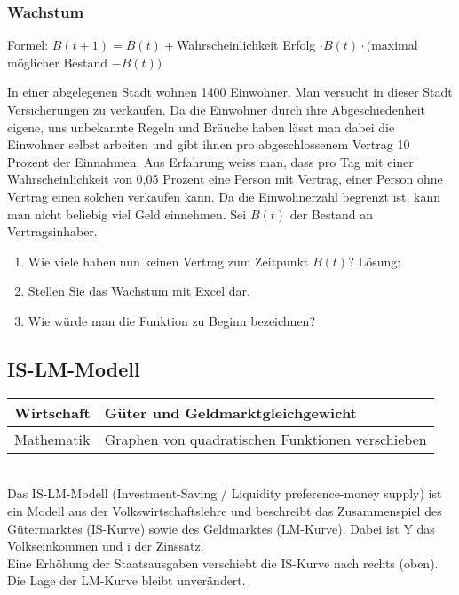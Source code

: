 \documentclass[11pt, twocolumn, a4paper]{scrartcl}
\begin{document}
\subsubsection{Wachstum}
Formel:
$B(t+1) = B(t) +$Wahrscheinlichkeit Erfolg $\cdot B(t) \cdot ($maximal möglicher Bestand $- B(t))$

In einer abgelegenen Stadt wohnen 1400 Einwohner. Man versucht in dieser Stadt Versicherungen zu verkaufen. Da die Einwohner durch ihre Abgeschiedenheit eigene, uns unbekannte Regeln und Bräuche haben lässt man dabei die Einwohner selbst arbeiten und gibt ihnen pro abgeschlossenem Vertrag 10 Prozent der Einnahmen. Aus Erfahrung weiss man, dass pro Tag mit einer Wahrscheinlichkeit von 0,05 Prozent eine Person mit Vertrag, einer Person ohne Vertrag einen solchen verkaufen kann. Da die Einwohnerzahl begrenzt ist, kann man nicht beliebig viel Geld einnehmen.
Sei $B(t)$ der Bestand an Vertragsinhaber. 
\begin{enumerate}
\item Wie viele haben nun keinen Vertrag zum Zeitpunkt $B(t)$? Lösung: \\

\item Stellen Sie das Wachstum mit Excel dar.

\item Wie würde man die Funktion zu Beginn bezeichnen?
\end{enumerate}
\subsection{IS-LM-Modell}



\begin{tabular}{l l}
\toprule
Wirtschaft & Güter und Geldmarktgleichgewicht \\
\midrule
Mathematik& Graphen von quadratischen Funktionen verschieben \\

\bottomrule
\end{tabular}\\

Das IS-LM-Modell (Investment-Saving / Liquidity preference-money supply) ist ein Modell aus der Volkswirtschaftslehre und beschreibt das Zusammenspiel des Gütermarktes (IS-Kurve) sowie des Geldmarktes (LM-Kurve). Dabei ist Y das Volkseinkommen und i der Zinssatz.\\


Eine Erhöhung der Staatsausgaben verschiebt die IS-Kurve nach rechts (oben). Die Lage der LM-Kurve bleibt unverändert.\\
\end{document}
